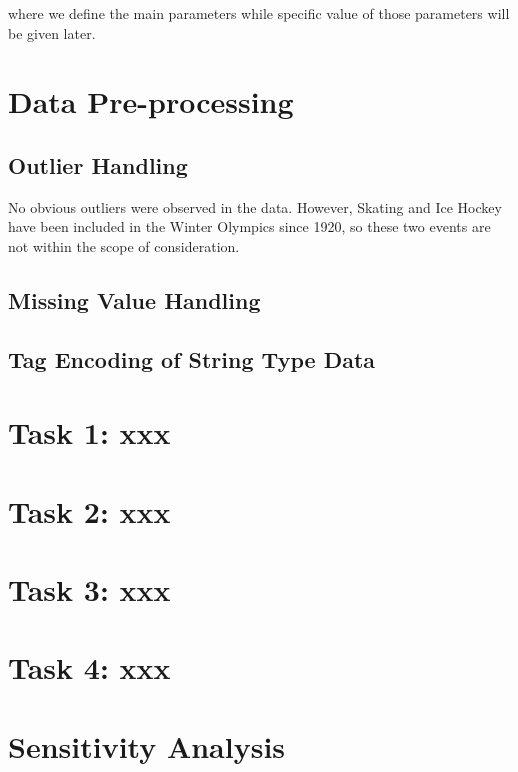 \documentclass[13pt]{article}
\begin{document}
\noindent where we define the main parameters while specific value of those 
parameters will be given later.


\section{Data Pre-processing}
\subsection{Outlier Handling}
No obvious outliers were observed in the data. However, Skating and Ice Hockey have been included in the Winter Olympics since 1920, so these two events are not within the scope of consideration.



\subsection{Missing Value Handling}



\subsection{Tag Encoding of String Type Data}


\section{Task 1: xxx}

\section{Task 2: xxx}

\section{Task 3: xxx}

\section{Task 4: xxx}

\section{Sensitivity Analysis}
\end{document}
